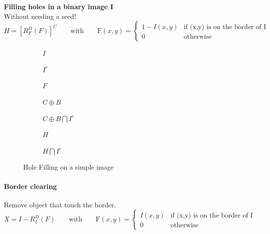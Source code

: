 \textbf{Filling holes in a binary image I}\\
Without needing a seed!\\
\[
	H = [R_F^D(F)]^C  \qquad  \text{with} \qquad \text{F}(x,y)=\begin{cases} 1-I(x,y) & \text{if (x,y) is on the border of I}\\
                                                             0 & \text{otherwise} \end{cases}
\]
\begin{figure}[h!]
\centering
\begin{subfigure}[b]{0.13\textwidth}
\centering
{}
\caption{$I$}
\end{subfigure}
\begin{subfigure}[b]{0.13\textwidth}
\centering
{}
\caption{$I^c$}
\end{subfigure}
\begin{subfigure}[b]{0.13\textwidth}
\centering
{}
\caption{$F$}
\end{subfigure}
\begin{subfigure}[b]{0.13\textwidth}
\centering
{}
\caption{$C \oplus B$}
\end{subfigure}
\begin{subfigure}[b]{0.13\textwidth}
\centering
{}
\caption{$C \oplus B \bigcap I^c$}
\end{subfigure}
\begin{subfigure}[b]{0.13\textwidth}
\centering
{}
\caption{$H$}
\end{subfigure}
\begin{subfigure}[b]{0.13\textwidth}
\centering
{}
\caption{$H \bigcap I^c$}
\end{subfigure}
\caption{Hole Filling on a simple image}
\end{figure}

\paragraph{Border clearing}
Remove object that touch the border.
\[
X = I-R_I^D(F)  \qquad  \text{with} \qquad \text{F}(x,y)=\begin{cases} I(x,y) & \text{if (x,y) is on the border of I}\\
0 & \text{otherwise} \end{cases}
\]

